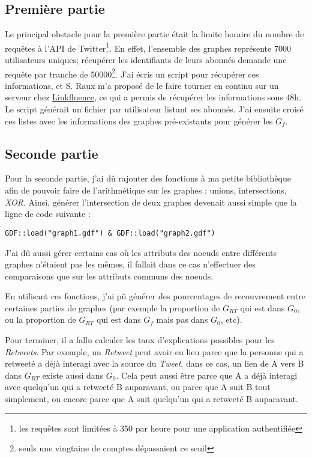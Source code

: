 \documentclass[]{article}
\begin{document}
\subsection{Première partie}

Le principal obstacle pour la première partie était la limite horaire du
nombre de requêtes à l'API de Twitter\footnote{les requêtes sont
 limitées à 350 par heure pour une application authentifiée}. En effet,
l'ensemble des graphes représente 7000 utilisateurs uniques; récupérer
les identifiants de leurs abonnés demande une requête par tranche de
50000\footnote{seuls une vingtaine de comptes dépassaient ce seuil}.
J'ai écris un script pour récupérer ces informations, et S. Raux m'a
proposé de le faire tourner en continu sur un serveur chez
\href{http://fr.linkfluence.net/}{Linkfluence}, ce qui a permis de
récupérer les informations sous 48h. Le script générait un fichier par
utilisateur listant ses abonnés. J'ai ensuite croisé ces listes avec les
informations des graphes pré-existants pour générer les $G_{f}$.

\subsection{Seconde partie}

Pour la seconde partie, j'ai dû rajouter des fonctions à ma petite
bibliothèque afin de pouvoir faire de l'arithmétique sur les graphes :
unions, intersections, \emph{XOR}. Ainsi, générer l'intersection de deux
graphes devenait aussi simple que la ligne de code suivante :
\begin{verbatim}
GDF::load("graph1.gdf") & GDF::load("graph2.gdf")
\end{verbatim}
J'ai dû aussi gérer certains cas où les attributs des noeuds entre
différents graphes n'étaient pas les mêmes, il fallait dans ce cas
n'effectuer des comparaisons que sur les attributs communs des noeuds.

En utilisant ces fonctions, j'ai pû générer des pourcentages de
recouvrement entre certaines parties de graphes (par exemple la
proportion de $G_{RT}$ qui est dans $G_{0}$, ou la proportion de $G_{RT}$ qui est
dans $G_{f}$ mais pas dans $G_{0}$, etc).

Pour terminer, il a fallu calculer les taux d'explications possibles
pour les \emph{Retweets}. Par exemple, un \emph{Retweet} peut avoir eu
lieu parce que la personne qui a retweeté a déjà interagi avec la
source du \emph{Tweet}, dans ce cas, un lien de A vers B dans $G_{RT}$
existe aussi dans $G_{0}$. Cela peut aussi être parce que A a déjà 
interagi avec quelqu'un qui a retweeté B auparavant, ou parce que A
suit B tout simplement, ou encore parce que A suit quelqu'un qui a retweeté
B auparavant.
\end{document}
